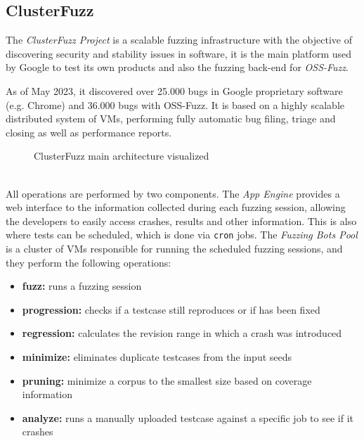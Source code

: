 \subsection{ClusterFuzz}
The \textit{ClusterFuzz Project} is a scalable fuzzing infrastructure with the objective of discovering security and stability issues in software, it is the main platform used by Google to test its own products and also the fuzzing back-end for \textit{OSS-Fuzz}.

As of May 2023, it discovered over 25.000 bugs in Google proprietary software (e.g. Chrome) and 36.000 bugs with OSS-Fuzz. \cite{clusterfuzz_docs}
It is based on a highly scalable distributed system of VMs, performing fully automatic bug filing, triage and closing as well as performance reports.
\begin{figure}[h]
\caption{ClusterFuzz main architecture visualized \cite{clusterfuzz_docs}}
\label{fig:clusterfuzz_architecture}
\end{figure}
\ \\
All operations are performed by two components.
The \textit{App Engine} provides a web interface to the information collected during each fuzzing session, allowing the developers to easily access crashes, results and other information. This is also where tests can be scheduled, which is done via \verb|cron| jobs.
The \textit{Fuzzing Bots Pool} is a cluster of VMs responsible for running the scheduled fuzzing sessions, and they perform the following operations:
\begin{itemize}
    \item \textbf{fuzz:} runs a fuzzing session
    \item \textbf{progression:} checks if a testcase still reproduces or if has been fixed
    \item \textbf{regression:} calculates the revision range in which a crash was introduced
    \item \textbf{minimize:} eliminates duplicate testcases from the input seeds
    \item \textbf{pruning:} minimize a corpus to the smallest size based on coverage information
    \item \textbf{analyze:} runs a manually uploaded testcase against a specific job to see if it crashes
\end{itemize}


